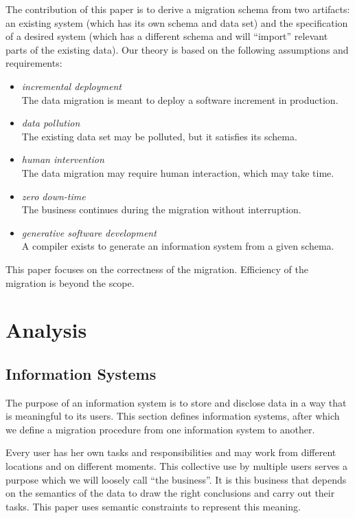 \documentclass[runningheads]{llncs}
\begin{document}
   The contribution of this paper is to derive a migration schema from two artifacts: an existing system
   (which has its own schema and data set) and the specification of a desired system (which has a different schema and will ``import'' relevant parts of the existing data).   
   Our theory is based on the following assumptions and requirements:
\begin{itemize}
   \item {\em incremental deployment}\\The data migration is meant to deploy a software increment in production.
   \item {\em data pollution}\\The existing data set may be polluted, but it satisfies its schema.
   \item {\em human intervention}\\The data migration may require human interaction, which may take time.
   \item {\em zero down-time}\\The business continues during the migration without interruption.
   \item {\em generative software development}\\A compiler exists to generate an information system from a given schema.
\end{itemize}
   This paper focuses on the correctness of the migration.
   Efficiency of the migration is beyond the scope.

\section{Analysis}
\label{sct:Analysis}
\subsection{Information Systems}
   The purpose of an information system is to store and disclose data in a way that is meaningful to its users.
   This section defines information systems, after which we define a migration procedure from one information system to another.

   Every user has her own tasks and responsibilities and may work from different locations and on different moments.
   This collective use by multiple users serves a purpose which we will loosely call ``the business''.
   It is this business that depends on the semantics of the data to draw the right conclusions and carry out their tasks.
   This paper uses semantic constraints to represent this meaning.
   
\end{document}
